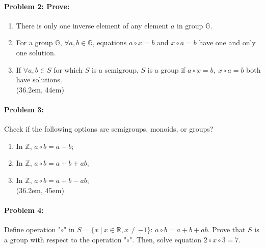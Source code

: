 \documentclass[12pt]{scrartcl}
\begin{document}
{{\newpage

\paragraph*{Problem 2: Prove:}

	\begin{enumerate}[label=\arabic*)]
	
	\item There is only one inverse element of any element $a$ in group $\mathbb{G}$.
	\item For a group $\mathbb{G}$, $\forall a, b \in \mathbb{G}$, equations $a \circ x = b$ and $x \circ a = b$ have one and only one solution.
	\item If $\forall a, b \in S$ for which $S$ is a semigroup, $S$ is a group if $a \circ x = b, ~ x \circ a = b$ both have solutions.\\

	\framebox(36.2em, 44em){}

	\end{enumerate}

\newpage


\paragraph*{Problem 3:} Check if the following options are semigroups, monoids, or groups?

	\begin{enumerate}[label=\arabic*)]
	
	\item In $\mathbb{Z}$, $a \circ b = a - b$;

	\item In $\mathbb{Z}$, $a \circ b = a + b + ab$;

	\item In $\mathbb{Z}$, $a \circ b = a + b - ab$;\\

	\framebox(36.2em, 45em){}

	\end{enumerate}

	\newpage

\paragraph*{Problem 4:}

	\begin{spacing}{1.2}Define operation "$\circ$" in $S=\{x ~ | ~ x \in \mathbb{R}, x \neq -1\}$: $a \circ b = a+ b+ ab$. Prove that $S$ is a group with respect to the operation "$\circ$". Then, solve equation $2 \circ x \circ 3 = 7$.\end{spacing}

}}
\end{document}
